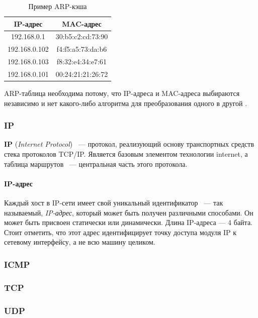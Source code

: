 \begin{table}[H]
\caption{Пример ARP-кэша}
\label{arpcache}
	\begin{tabular}{|c|c|}
	\hline
	IP-адрес & MAC-адрес\\
	\hline
	192.168.0.1 & 30:b5:c2:cd:73:90 \\
	\hline
	192.168.0.102 & f4:f5:a5:73:da:b6 \\
	\hline
	192.168.0.103 & f8:32:e4:34:e7:61 \\
	\hline
	192.168.0.101 & 00:24:21:21:26:72 \\
	\hline
	\end{tabular}
\end{table}

ARP-таблица необходима потому, что IP-адреса и MAC-адреса выбираются независимо и нет какого-либо алгоритма для преобразования одного в другой \cite{arpcitforum}.

\subsubsection{IP}

\textbf{IP} (\textit{Internet Protocol}) ~--- протокол, реализующий основу транспортных средств стека протоколов TCP/IP. Является базовым элементом технологии internet, а таблица маршрутов ~--- центральная часть этого      протокола.

\paragraph{IP-адрес}

Каждый хост в IP-сети имеет свой уникальный идентификатор ~--- так называемый, \textit{IP-адрес}, который может быть получен различными способами. Он может быть присвоен статически или динамически. Длина IP-адреса --- 4 байта. Стоит отметить, что этот адрес идентифицирует точку доступа модуля IP к сетевому интерфейсу, а не всю машину целиком.

\subsubsection{ICMP}
\subsubsection{TCP}
\subsubsection{UDP}

